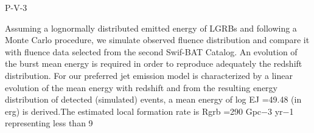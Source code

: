 P-V-3


\bigskip



\bigskip

\noindent Assuming a lognormally distributed emitted energy of LGRBs and following a Monte Carlo procedure, we simulate observed fluence distribution and compare it with fluence data selected from the second Swif-BAT Catalog. An evolution of the burst mean energy is required in order to reproduce adequately the redshift distribution.
For our preferred jet emission model is characterized by a linear evolution of the mean energy with redshift and from the resulting energy distribution of detected (simulated) events, a mean energy of log EJ =49.48 (in erg) is derived.The estimated local formation rate is Rgrb =290 Gpc−3 yr−1 representing less than 9%
